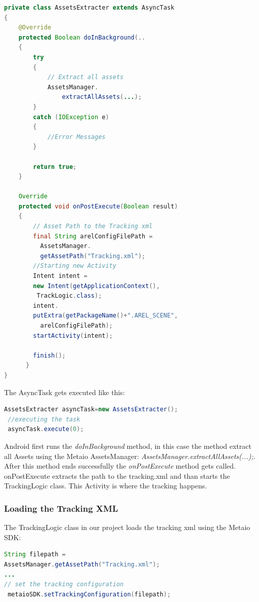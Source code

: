 \begin{lstlisting}[language=java, caption=Extracting Assets]
private class AssetsExtracter extends AsyncTask
{		
	@Override
	protected Boolean doInBackground(.. 
	{
		try 
		{
			// Extract all assets
			AssetsManager.
				extractAllAssets(...);
		} 
		catch (IOException e) 
		{
			//Error Messages
		}
			
		return true;
	}
		
	Override
	protected void onPostExecute(Boolean result) 
	{
		// Asset Path to the Tracking xml
		final String arelConfigFilePath = 
		  AssetsManager.
		  getAssetPath("Tracking.xml");
		//Starting new Activity  
		Intent intent = 
		new Intent(getApplicationContext(), 
		 TrackLogic.class);
		intent.
		putExtra(getPackageName()+".AREL_SCENE", 
		  arelConfigFilePath);
		startActivity(intent);

		finish();
	  }
}
\end{lstlisting}
The AsyncTask gets executed like this:

\begin{lstlisting}[language=java, caption=executing AsyncTask]
 AssetsExtracter asyncTask=new AssetsExtracter();
 //executing the task
 asyncTask.execute(0);
\end{lstlisting}





Android first runs the \textit{doInBackground} method, in this case the method extract all Assets using the Metaio 	AssetsManager: 	\textit{AssetsManager.extractAllAssets(...);}. After this method ends successfully the \textit{onPostExecute} method gets called.
\\


onPostExecute extracts the path to the tracking.xml and than starts the TrackingLogic class. This Activity is where the tracking happens.

\subsubsection{Loading the Tracking XML}
The TrackingLogic class in our project loads the tracking xml using the Metaio SDK:
\begin{lstlisting}[language=java, caption=executing AsyncTask]
String filepath = 
AssetsManager.getAssetPath("Tracking.xml");
...
// set the tracking configuration
 metaioSDK.setTrackingConfiguration(filepath); 
\end{lstlisting}

